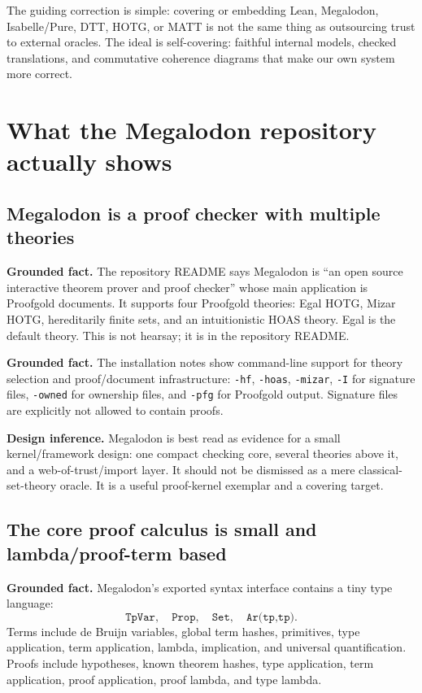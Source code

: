 \documentclass[11pt]{article}
\newcommand{\Megalodon}{\textup{Megalodon}}
\newcommand{\HOTG}{\textup{HOTG}}
\newcommand{\DTT}{\textup{DTT}}
\newcommand{\MATT}{\textup{MATT}}
\newcommand{\Lean}{\textup{Lean}}
\newcommand{\code}[1]{\texttt{#1}}
\newcommand{\Fact}{\textbf{Grounded fact.}}
\newcommand{\Infer}{\textbf{Design inference.}}
\begin{document}
The guiding correction is simple: covering or embedding \Lean{}, \Megalodon{}, Isabelle/Pure, \DTT{}, \HOTG{}, or \MATT{} is not the same thing as outsourcing trust to external oracles.  The ideal is self-covering: faithful internal models, checked translations, and commutative coherence diagrams that make our own system more correct.

\section{What the \Megalodon{} repository actually shows}

\subsection{Megalodon is a proof checker with multiple theories}

\Fact{} The repository README says \Megalodon{} is ``an open source interactive theorem prover and proof checker'' whose main application is Proofgold documents.  It supports four Proofgold theories: Egal \HOTG{}, Mizar \HOTG{}, hereditarily finite sets, and an intuitionistic HOAS theory.  Egal is the default theory.  This is not hearsay; it is in the repository README.\cite{megalodon-readme}

\Fact{} The installation notes show command-line support for theory selection and proof/document infrastructure: \code{-hf}, \code{-hoas}, \code{-mizar}, \code{-I} for signature files, \code{-owned} for ownership files, and \code{-pfg} for Proofgold output.  Signature files are explicitly not allowed to contain proofs.\cite{megalodon-install}

\Infer{} \Megalodon{} is best read as evidence for a small kernel/framework design: one compact checking core, several theories above it, and a web-of-trust/import layer.  It should not be dismissed as a mere classical-set-theory oracle.  It is a useful proof-kernel exemplar and a covering target.

\subsection{The core proof calculus is small and lambda/proof-term based}

\Fact{} \Megalodon{}'s exported syntax interface contains a tiny type language:
\[
\code{TpVar},\quad \code{Prop},\quad \code{Set},\quad \code{Ar(tp,tp)}.
\]
Terms include de Bruijn variables, global term hashes, primitives, type application, term application, lambda, implication, and universal quantification.  Proofs include hypotheses, known theorem hashes, type application, term application, proof application, proof lambda, and type lambda.\cite{megalodon-syntax}
\end{document}
